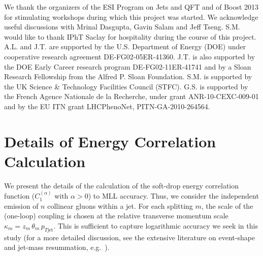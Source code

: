 \documentclass[letterpaper,11pt]{article}
\newcommand{\C}[2]{C^{(#2)}_{#1}}
\newcommand{\ea}{{\C{1}{\alpha}}}
\begin{document}
\begin{acknowledgments}
  We thank the organizers of the ESI Program on Jets and QFT and of
  Boost 2013 for stimulating workshops during which this project was
  started.  We acknowledge useful discussions with Mrinal Dasgupta,
  Gavin Salam and Jeff Tseng. S.M. would like to thank IPhT Saclay for hospitality during the course of this project.
    A.L. and J.T. are supported by the U.S. Department of
  Energy (DOE) under cooperative research agreement
  DE-FG02-05ER-41360. J.T. is also supported by the DOE Early Career
  research program DE-FG02-11ER-41741 and by a Sloan Research
  Fellowship from the Alfred P. Sloan Foundation. S.M. is supported by
  the UK Science \& Technology Facilities Council (STFC). G.S. is
  supported by the French Agence Nationale de la Recherche,
  under grant ANR-10-CEXC-009-01 and by the EU ITN grant LHCPhenoNet,
  PITN-GA-2010-264564.

\end{acknowledgments}

\appendix


\section{Details of Energy Correlation Calculation}
\label{app:angdist}


We present the details of the calculation of the soft-drop energy correlation function ($\ea$ with $\alpha>0$) to MLL accuracy.
Thus, we consider the independent emission of $n$ collinear gluons within a jet. For each splitting $m$, the scale of the (one-loop) coupling is chosen at the relative transverse momentum scale $\kappa_m = z_m \, \theta_m \, p_{T \text{jet}}$. This is sufficient to capture logarithmic accuracy we seek in this study (for a more detailed discussion, see the extensive literature on event-shape and jet-mass resummation, e.g.~\cite{Catani:1992ua,Dokshitzer:1998kz,caesar}).
\end{document}
